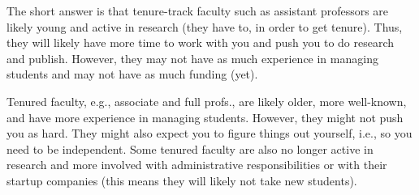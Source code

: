 \documentclass[oneside,11pt]{memoir}
\newenvironment{commentbox}[1][]{
  \small
  \begin{mybox}
    {\small \textbf{#1}}
  }{
  \end{mybox}
}
\begin{document}
The short answer is that tenure-track faculty such as assistant professors are likely young and active in research (they have to, in order to get tenure). Thus, they will likely have more time to work with you and push you to do research and publish. However, they may not have as much experience in managing students and may not have as much funding (yet).

Tenured faculty, e.g., associate and full profs., are likely older, more well-known, and have more experience in managing students.  However, they might not push you as hard. They might also expect you to figure things out yourself, i.e., so you need to be independent.  Some tenured faculty are also no longer active in research and more involved with administrative responsibilities or with their startup companies (this means they will likely not take new students).


\end{document}
